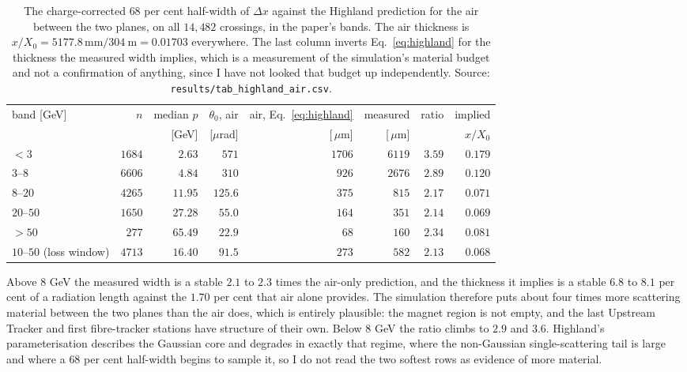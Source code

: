 \documentclass[11pt,a4paper]{article}
\newcommand{\um}{\ensuremath{\,\mu\mathrm{m}}}
\newcommand{\mm}{\ensuremath{\,\mathrm{mm}}}
\begin{document}
\begin{table}[tbp]
  \centering
  \caption{The charge-corrected $68$ per cent half-width of $\Delta x$ against
  the Highland prediction for the air between the two planes, on all $14{,}482$
  crossings, in the paper's bands. The air thickness is
  $x/X_0 = 5177.8\mm / 304\ \mathrm{m} = 0.01703$ everywhere. The last column
  inverts Eq.~\eqref{eq:highland} for the thickness the measured width implies,
  which is a measurement of the simulation's material budget and not a
  confirmation of anything, since I have not looked that budget up
  independently. Source: \texttt{results/tab\_highland\_air.csv}.}
  \label{tab:highland}
  \footnotesize
  \setlength{\tabcolsep}{4pt}
  \begin{tabular}{lrrrrrrr}
    \toprule
    band [GeV] & $n$ & median $p$ & $\theta_0$, air & air, Eq.~\eqref{eq:highland}
      & measured & ratio & implied \\
    & & [GeV] & [$\mu$rad] & [\um] & [\um] & & $x/X_0$ \\
    \midrule
    $<3$       & $1684$ & $2.63$   & $571$  & $1706$ & $6119$ & $3.59$ & $0.179$ \\
    $3$--$8$   & $6606$ & $4.84$   & $310$  & $926$  & $2676$ & $2.89$ & $0.120$ \\
    $8$--$20$  & $4265$ & $11.95$  & $125.6$& $375$  & $815$  & $2.17$ & $0.071$ \\
    $20$--$50$ & $1650$ & $27.28$  & $55.0$ & $164$  & $351$  & $2.14$ & $0.069$ \\
    $>50$      & $277$  & $65.49$  & $22.9$ & $68$   & $160$  & $2.34$ & $0.081$ \\
    \midrule
    $10$--$50$ (loss window) & $4713$ & $16.40$ & $91.5$ & $273$ & $582$ & $2.13$ & $0.068$ \\
    \bottomrule
  \end{tabular}
\end{table}

Above $8$ GeV the measured width is a stable $2.1$ to $2.3$ times the air-only
prediction, and the thickness it implies is a stable $6.8$ to $8.1$ per cent of a
radiation length against the $1.70$ per cent that air alone provides. The
simulation therefore puts about four times more scattering material between the
two planes than the air does, which is entirely plausible: the magnet region is
not empty, and the last Upstream Tracker and first fibre-tracker stations have
structure of their own. Below $8$ GeV the ratio climbs to $2.9$ and $3.6$.
Highland's parameterisation describes the Gaussian core and degrades in exactly
that regime, where the non-Gaussian single-scattering tail is large and where a
$68$ per cent half-width begins to sample it, so I do not read the two softest
rows as evidence of more material.
\end{document}
